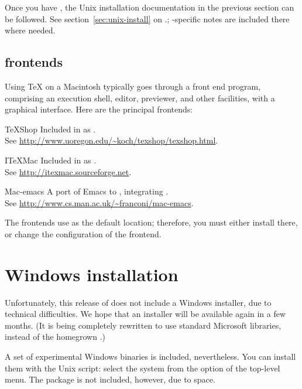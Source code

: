 \documentclass{article}
\begin{document}
Once you have , the Unix installation documentation in the
previous section can be followed.  See section~\ref{sec:unix-install} on
\p.\pageref{sec:unix-install}; \MacOSX-specific notes are included there
where needed.


\subsection{\MacOSX{} frontends}

Using \TeX{} on a Macintosh typically goes through a front end program,
comprising an execution shell, editor, previewer, and other facilities,
with a graphical interface.  Here are the principal frontends:

\begin{cmddescription}
\item [TeXShop] Included in \TL{} as .
  \\See \url{http://www.uoregon.edu/~koch/texshop/texshop.html}.

\item [ITeXMac] Included in \TL{} as .
  \\See \url{http://itexmac.sourceforge.net}.

\item [Mac-emacs] A port of Emacs to \MacOSX{}, integrating .
  \\See \url{http://www.cs.man.ac.uk/~franconi/mac-emacs}.

\end{cmddescription}

The frontends use  as the default location;
therefore, you must either install \TL{} there, or change the
configuration of the frontend.


\section{Windows installation}
\label{sec:win-install}

Unfortunately, this release of \TL{} does not include a Windows
installer, due to technical difficulties.  We hope that an installer
will be available again in a few months.  (It is being completely
rewritten to use standard Microsoft libraries, instead of the homegrown
.)

A set of experimental Windows binaries is included, nevertheless.  You
can install them with the Unix  script: select
the  system from the  option of the top-level
menu.  The  package is not included, however, due to
space.
\end{document}
